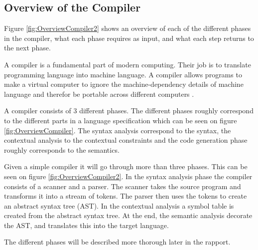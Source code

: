 \subsection{Overview of the Compiler}


Figure \ref{fig:OverviewCompiler2} shows an overview of each of the different phases in the compiler, what each phase requires as input, and what each step returns to the next phase.

A compiler is a fundamental part of modern computing. Their job is to translate programming language into machine language. A compiler allows programs to make a virtual computer to ignore the machine-dependency details of machine language and therefor be portable across different computers  \citep{CraftingACompiler}.


A compiler consists of 3 different phases. The different phases roughly correspond to the different parts in a language specification which can be seen on figure \ref{fig:OverviewCompiler}. The syntax analysis correspond to the syntax, the contextual analysis to the contextual constraints and the code generation phase roughly corresponds to the semantics.

Given a simple compiler it will go through more than three phases. This can be seen on figure \ref{fig:OverviewCompiler2}. In the syntax analysis phase the compiler consists of a scanner and a parser. The scanner takes the source program and transforms it into a stream of tokens. The parser then uses the tokens to create an abstract syntax tree (AST). In the contextual analysis a symbol table is created from the abstract syntax tree. At the end, the semantic analysis decorate the AST, and translates this into the target language.

The different phases will be described more thorough later in the rapport. 